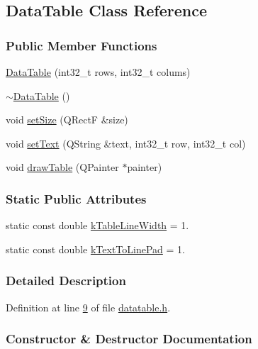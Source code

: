 \hypertarget{class_data_table}{}\subsection{Data\+Table Class Reference}
\label{class_data_table}
\subsubsection*{Public Member Functions}
\begin{DoxyCompactItemize}
\item 
\hyperlink{class_data_table_a9d37b5de498e8436f74cd51e51ec4948}{Data\+Table} (int32\+\_\+t rows, int32\+\_\+t colums)
\item 
\hyperlink{class_data_table_a86095a8a5abd63d50603d4ca0db253d7}{$\sim$\+Data\+Table} ()
\item 
void \hyperlink{class_data_table_a8a8cd6f95caaaff148993f8e28eeb703}{set\+Size} (Q\+Rect\+F \&size)
\item 
void \hyperlink{class_data_table_aee0d28c77116b51360f0124a529cb3ff}{set\+Text} (Q\+String \&text, int32\+\_\+t row, int32\+\_\+t col)
\item 
void \hyperlink{class_data_table_a3a3695e88dcd4d4aad5cc941ec7e6e55}{draw\+Table} (Q\+Painter $\ast$painter)
\end{DoxyCompactItemize}
\subsubsection*{Static Public Attributes}
\begin{DoxyCompactItemize}
\item 
static const double \hyperlink{class_data_table_aa4aed4c624ca9a8e68c9ecc4d2b43458}{k\+Table\+Line\+Width} = 1.
\item 
static const double \hyperlink{class_data_table_ab0703eeee2cf6e45fc74356432434ac6}{k\+Text\+To\+Line\+Pad} = 1.
\end{DoxyCompactItemize}


\subsubsection{Detailed Description}


Definition at line \hyperlink{datatable_8h_source_l00009}{9} of file \hyperlink{datatable_8h_source}{datatable.\+h}.



\subsubsection{Constructor \& Destructor Documentation}
\hypertarget{class_data_table_a9d37b5de498e8436f74cd51e51ec4948}{}
